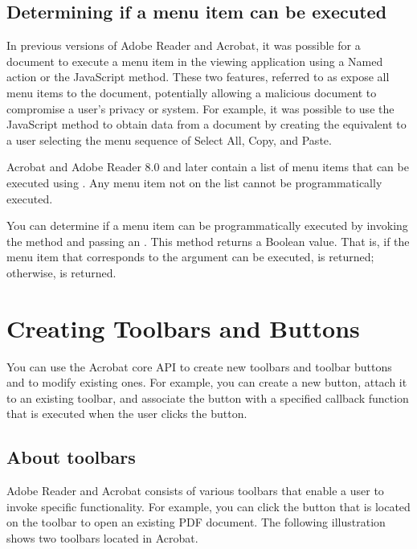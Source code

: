 \documentclass[letterpaper,12pt,english,openany,oneside]{sphinxmanual}
\begin{document}
\section{Determining if a menu item can be executed}
\label{\detokenize{Plugins_Menu:determining-if-a-menu-item-can-be-executed}}
In previous versions of Adobe Reader and Acrobat, it was possible for a document to execute a menu item in the viewing application using a Named action or the  JavaScript method. These two features, referred to as  expose all menu items to the document, potentially allowing a malicious document to compromise a user’s privacy or system. For example, it was possible to use the  JavaScript method to obtain data from a document by creating the equivalent to a user selecting the menu sequence of Select All, Copy, and Paste.

Acrobat and Adobe Reader 8.0 and later contain a list of menu items that can be executed using . Any menu item not on the list cannot be programmatically executed.

You can determine if a menu item can be programmatically executed by invoking the  method and passing an . This method returns a Boolean value. That is, if the menu item that corresponds to the  argument can be executed,  is returned; otherwise,  is returned.


\chapter{Creating Toolbars and Buttons}
\label{\detokenize{Plugins_Toolbutton:creating-toolbars-and-buttons}}\label{\detokenize{Plugins_Toolbutton::doc}}
You can use the Acrobat core API to create new toolbars and toolbar buttons and to modify existing ones. For example, you can create a new button, attach it to an existing toolbar, and associate the button with a specified callback function that is executed when the user clicks the button.


\section{About toolbars}
\label{\detokenize{Plugins_Toolbutton:about-toolbars}}
Adobe Reader and Acrobat consists of various toolbars that enable a user to invoke specific functionality. For example, you can click the  button that is located on the  toolbar to open an existing PDF document. The following illustration shows two toolbars located in Acrobat.
\end{document}
